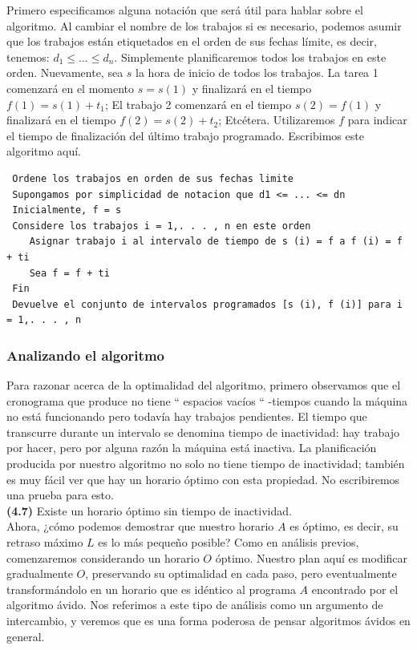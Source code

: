 \documentclass[a4paper, 12pt]{book}
\theoremstyle{dotless}
\begin{document}
Primero especificamos alguna notación que será útil para hablar sobre el algoritmo. Al cambiar el nombre de los trabajos si es necesario, podemos asumir que los trabajos están etiquetados en el orden de sus fechas límite, es decir, tenemos: $d_1 ≤ ... ≤ d_n$. Simplemente planificaremos todos los trabajos en este orden. Nuevamente, sea $s$ la hora de inicio de todos los trabajos. La tarea 1 comenzará en el momento $s = s (1)$ y finalizará en el tiempo $f (1) = s (1) + t_1$; El trabajo 2 comenzará en el tiempo $s (2) = f (1)$ y finalizará en el tiempo $f (2) = s (2) + t_2$; Etcétera. Utilizaremos $f$ para indicar el tiempo de finalización del último trabajo programado. Escribimos este algoritmo aquí.\\

\begin{lstlisting}
 Ordene los trabajos en orden de sus fechas limite
 Supongamos por simplicidad de notacion que d1 <= ... <= dn
 Inicialmente, f = s
 Considere los trabajos i = 1,. . . , n en este orden
    Asignar trabajo i al intervalo de tiempo de s (i) = f a f (i) = f + ti
    Sea f = f + ti
 Fin
 Devuelve el conjunto de intervalos programados [s (i), f (i)] para i = 1,. . . , n
\end{lstlisting}

\subsubsection*{Analizando el algoritmo}
Para razonar acerca de la optimalidad del algoritmo, primero observamos que el cronograma que produce no tiene `` espacios vacíos `` -tiempos cuando la máquina no está funcionando pero todavía hay trabajos pendientes. El tiempo que transcurre durante un intervalo se denomina tiempo de inactividad: hay trabajo por hacer, pero por alguna razón la máquina está inactiva. La planificación producida por nuestro algoritmo no solo no tiene tiempo de inactividad; también es muy fácil ver que hay un horario óptimo con esta propiedad. No escribiremos una prueba para esto.\\

\textbf{(4.7)} Existe un horario óptimo sin tiempo de inactividad.\\

Ahora, ¿cómo podemos demostrar que nuestro horario $A$ es óptimo, es decir, su retraso máximo $L$ es lo más pequeño posible? Como en análisis previos, comenzaremos considerando un horario $O$ óptimo. Nuestro plan aquí es modificar gradualmente $O$, preservando su optimalidad en cada paso, pero eventualmente transformándolo en un horario que es idéntico al programa $A$ encontrado por el algoritmo ávido. Nos referimos a este tipo de análisis como un argumento de intercambio, y veremos que es una forma poderosa de pensar algoritmos ávidos en general.\\
\end{document}
